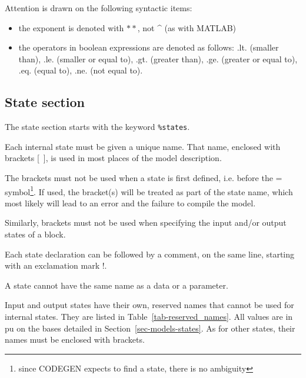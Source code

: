 Attention is drawn on the following syntactic items:
\begin{itemize}
\item the exponent is denoted with $**$, not \^{} (as with MATLAB)
\item the operators in boolean expressions are denoted as follows: .lt. (smaller than), .le. (smaller or equal to), .gt. (greater than), .ge. (greater or equal to), .eq. (equal to), .ne. (not equal to).
\end{itemize}

\subsection{State section}\label{sec-states}

The state section starts with the keyword {\tt \%states}.

Each internal state must be given a unique name. That name, enclosed with brackets [~], is used in most places of the model description. 

The brackets must not be used when a state is first defined, i.e. before the = symbol\footnote{since CODEGEN expects to find a state, there is no ambiguity}. If used, the bracket(s) will be treated as part of the state name, which most likely will lead to an error and the failure to compile the model.

Similarly, brackets must not be used when specifying the input and/or output states of a block.

Each state declaration can be followed by a comment, on the same line, starting with an exclamation mark !.

A state cannot have the same name as a data or a parameter.

Input and output states have their own, reserved names that cannot be used for internal states. They are listed in Table~\ref{tab-reserved_names}. All values are in pu on the bases detailed in Section~\ref{sec-models-states}. As for other states, their names must be enclosed with brackets.

